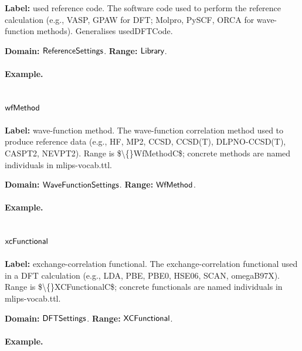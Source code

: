 \textbf{Label:} used reference code.
The software code used to perform the reference calculation (e.g., VASP, GPAW for DFT; Molpro, PySCF, ORCA for wave-function methods). Generalises usedDFTCode.

\textbf{Domain:} $\mathsf{ReferenceSettings}$.
\textbf{Range:} $\mathsf{Library}$.

\paragraph{Example.}

\subsection{$\mathsf{wfMethod}$}
\label{sec:term-wfMethod}

\textbf{Label:} wave-function method.
The wave-function correlation method used to produce reference data (e.g., HF, MP2, CCSD, CCSD(T), DLPNO-CCSD(T), CASPT2, NEVPT2). Range is \$\textbackslash\{\}WfMethodC\$; concrete methods are named individuals in mlips-vocab.ttl.

\textbf{Domain:} $\mathsf{WaveFunctionSettings}$.
\textbf{Range:} $\mathsf{WfMethod}$.

\paragraph{Example.}

\subsection{$\mathsf{xcFunctional}$}
\label{sec:term-xcFunctional}

\textbf{Label:} exchange-correlation functional.
The exchange-correlation functional used in a DFT calculation (e.g., LDA, PBE, PBE0, HSE06, SCAN, omegaB97X). Range is \$\textbackslash\{\}XCFunctionalC\$; concrete functionals are named individuals in mlips-vocab.ttl.

\textbf{Domain:} $\mathsf{DFTSettings}$.
\textbf{Range:} $\mathsf{XCFunctional}$.

\paragraph{Example.}

